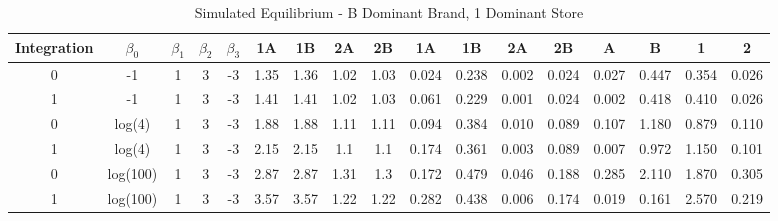 \documentclass[12pt]{article}%
\begin{document}
\begin{table}[h]
{\begin{tabular}{c|cccc|cccc|cccc|cccc}
    \midrule
    \multicolumn{1}{c|}{Integration} & \multicolumn{1}{c}{$\beta_0$} & \multicolumn{1}{c}{$\beta_1$} & \multicolumn{1}{c}{$\beta_2$} & \multicolumn{1}{c|}{$\beta_3$} & \multicolumn{1}{c}{1A} & \multicolumn{1}{c}{1B} & \multicolumn{1}{c}{2A} & \multicolumn{1}{c|}{2B} & \multicolumn{1}{c}{1A} & \multicolumn{1}{c}{1B} & \multicolumn{1}{c}{2A} & \multicolumn{1}{c|}{2B} & \multicolumn{1}{c}{A} & \multicolumn{1}{c}{B} & \multicolumn{1}{c}{1} & \multicolumn{1}{c}{2} \\
    \midrule
    \midrule
    0     & -1    & 1     & 3    & -3     & 1.35  & 1.36  & 1.02  & 1.03  & 0.024 & 0.238 & 0.002 & 0.024 & 0.027 & 0.447 & 0.354 & 0.026 \\
    1     & -1    & 1     & 3    & -3     & 1.41  & 1.41  & 1.02  & 1.03  & 0.061 & 0.229 & 0.001 & 0.024 & 0.002 & 0.418 & 0.410 & 0.026 \\
    0     & log(4) & 1     & 3    & -3     & 1.88  & 1.88  & 1.11  & 1.11  & 0.094 & 0.384 & 0.010 & 0.089 & 0.107 & 1.180 & 0.879 & 0.110 \\
    1     & log(4) & 1     & 3    & -3     & 2.15  & 2.15  & 1.1   & 1.1   & 0.174 & 0.361 & 0.003 & 0.089 & 0.007 & 0.972 & 1.150 & 0.101 \\
    0     & log(100) & 1     & 3    & -3     & 2.87  & 2.87  & 1.31  & 1.3   & 0.172 & 0.479 & 0.046 & 0.188 & 0.285 & 2.110 & 1.870 & 0.305 \\
    1     & log(100) & 1     & 3    & -3     & 3.57  & 3.57  & 1.22  & 1.22  & 0.282 & 0.438 & 0.006 & 0.174 & 0.019 & 0.161 & 2.570 & 0.219 \\


    \end{tabular}%
    }
    \caption{Simulated Equilibrium - B Dominant Brand, 1 Dominant Store}
  \label{tab:store effects - B, 1 dom}%
\end{table}%

\newpage
\end{document}
